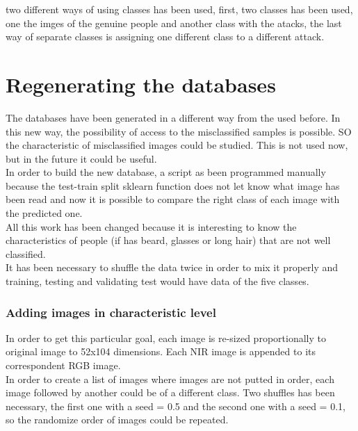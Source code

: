 two different ways of using classes has been used, first, two classes has been used, one the imges of the genuine people and another class with the atacks, the last way of separate classes is assigning one different class to a different attack.\\




\section{Regenerating the databases}
The databases have been generated in a different way from the used before. In this new way, the possibility of access to the misclassified samples is possible. SO the characteristic of misclassified images could be studied. This is not used now, but in the future it could be useful.\\

In order to build the new database, a script as been programmed manually because the test-train split sklearn function does not let know what image has been read and now it is possible to compare the right class of each image with the predicted one.\\

All this work has been changed because it is interesting to know the characteristics of people (if has beard, glasses or long hair) that are not well classified.\\

It has been necessary to shuffle the data twice in order to mix it properly and training, testing and validating test would have data of the five classes.\\

\subsubsection{Adding images in characteristic level}
In order to get this particular goal, each image is re-sized proportionally to original image to 52x104 dimensions. Each NIR image is appended to its correspondent RGB image.\\

In order to create a list of images where images are not putted in order, each image followed by another could be of a different class. Two shuffles has been necessary, the first one with a seed = 0.5 and the second one with a seed = 0.1, so the randomize order of images could be repeated.\\

